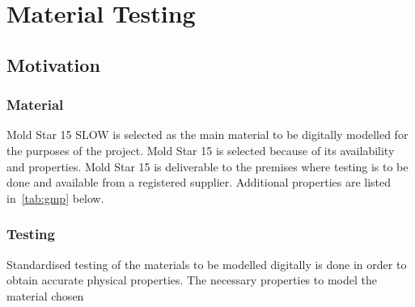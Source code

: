 \chapter{Material Testing}
\label{chp:MT}

\section{Motivation}

\subsection{Material}

Mold Star 15 SLOW is selected as the main material to be digitally modelled for the purposes of the project. Mold Star 15 is selected because of its availability and properties. Mold Star 15 is deliverable to the premises where testing is to be done and available from a registered supplier. Additional properties are listed in~\ref{tab:gmp} below.

\begin{table}[h]
	\centering
	\caption{Given Material Properties}
	\label{tab:gmp}
\end{table}


\subsection{Testing}

Standardised testing of the materials to be modelled digitally is done in order to obtain accurate physical properties. The necessary properties to model the material chosen 